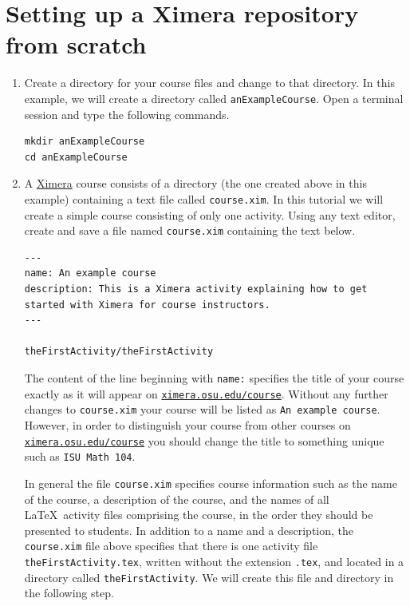 \documentclass{ximera}
\begin{document}
\section{Setting up a Ximera repository from scratch}
\begin{enumerate}
\item\label{Mkdir} Create a directory for your course files
and change to that directory.
In this example, we will create a directory called
\verb!anExampleCourse!.
Open a terminal session and type the following commands.
\begin{center}
\begin{verbatim}
mkdir anExampleCourse
cd anExampleCourse 
\end{verbatim}
\end{center}

\item A \href{http://ximera.osu.edu}{\sf Ximera} 
course consists of a directory (the one
created above in this example)
containing a text file called \verb!course.xim!. 
In this tutorial we will create a simple
course consisting of only one activity.
Using any text editor, create and save a file named
\verb!course.xim! containing the text below.

\begin{verbatim}
---
name: An example course
description: This is a Ximera activity explaining how to get started with Ximera for course instructors.
---

theFirstActivity/theFirstActivity
\end{verbatim}
\begin{warning}
The content of the line beginning with \verb!name:!
specifies the title of your course exactly as it will appear on
\href{http://ximera.osu.edu/course}{\tt ximera.osu.edu/course}.
Without any further changes to \verb!course.xim!
your course will be listed as \verb!An example course!.
However, in order to distinguish your course from
other courses on
\href{http://ximera.osu.edu/course}{\tt ximera.osu.edu/course}
you should change the title to something unique
such as \verb!ISU Math 104!.
\end{warning}

\begin{remark}
In general the file \verb!course.xim! specifies course information
such as the name of the course, a description of the course,
and the names of all \LaTeX\ activity files 
comprising the course, in the order
they should be presented to students.
In addition to a name and a description,
the \verb!course.xim! file above specifies that 
there is one activity file \verb!theFirstActivity.tex!,
written without the extension \verb!.tex!,  
and located in a directory called \verb!theFirstActivity!.
We will create this file and directory in the following step.


\end{remark}
\end{enumerate}
\end{document}
